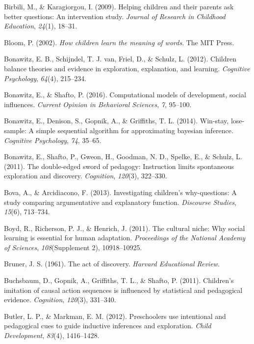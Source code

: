 \documentclass[english,floatsintext,man]{apa6}
\theoremstyle{definition}
\theoremstyle{definition}
\theoremstyle{definition}
\theoremstyle{remark}
\begin{document}
\hypertarget{ref-birbili2009helping}{}
Birbili, M., \& Karagiorgou, I. (2009). Helping children and their
parents ask better questions: An intervention study. \emph{Journal of
Research in Childhood Education}, \emph{24}(1), 18--31.

\hypertarget{ref-bloom2002children}{}
Bloom, P. (2002). \emph{How children learn the meaning of words}. The
MIT Press.

\hypertarget{ref-bonawitz2012children}{}
Bonawitz, E. B., Schijndel, T. J. van, Friel, D., \& Schulz, L. (2012).
Children balance theories and evidence in exploration, explanation, and
learning. \emph{Cognitive Psychology}, \emph{64}(4), 215--234.

\hypertarget{ref-bonawitz2016computational}{}
Bonawitz, E., \& Shafto, P. (2016). Computational models of development,
social influences. \emph{Current Opinion in Behavioral Sciences},
\emph{7}, 95--100.

\hypertarget{ref-bonawitz2014win}{}
Bonawitz, E., Denison, S., Gopnik, A., \& Griffiths, T. L. (2014).
Win-stay, lose-sample: A simple sequential algorithm for approximating
bayesian inference. \emph{Cognitive Psychology}, \emph{74}, 35--65.

\hypertarget{ref-bonawitz2011double}{}
Bonawitz, E., Shafto, P., Gweon, H., Goodman, N. D., Spelke, E., \&
Schulz, L. (2011). The double-edged sword of pedagogy: Instruction
limits spontaneous exploration and discovery. \emph{Cognition},
\emph{120}(3), 322--330.

\hypertarget{ref-bova2013investigating}{}
Bova, A., \& Arcidiacono, F. (2013). Investigating children's
why-questions: A study comparing argumentative and explanatory function.
\emph{Discourse Studies}, \emph{15}(6), 713--734.

\hypertarget{ref-boyd2011cultural}{}
Boyd, R., Richerson, P. J., \& Henrich, J. (2011). The cultural niche:
Why social learning is essential for human adaptation. \emph{Proceedings
of the National Academy of Sciences}, \emph{108}(Supplement 2),
10918--10925.

\hypertarget{ref-bruner1961act}{}
Bruner, J. S. (1961). The act of discovery. \emph{Harvard Educational
Review}.

\hypertarget{ref-buchsbaum2011children}{}
Buchsbaum, D., Gopnik, A., Griffiths, T. L., \& Shafto, P. (2011).
Children's imitation of causal action sequences is influenced by
statistical and pedagogical evidence. \emph{Cognition}, \emph{120}(3),
331--340.

\hypertarget{ref-butler2012preschoolers}{}
Butler, L. P., \& Markman, E. M. (2012). Preschoolers use intentional
and pedagogical cues to guide inductive inferences and exploration.
\emph{Child Development}, \emph{83}(4), 1416--1428.
\end{document}
